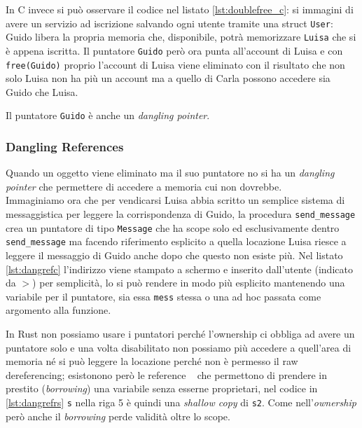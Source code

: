 \documentclass{article}
\begin{document}
In C invece si può osservare il codice nel listato \ref{lst:doublefree_c}: si immagini di avere un servizio ad iscrizione salvando ogni utente tramite una struct \texttt{User}: Guido libera la propria memoria che, disponibile, potrà memorizzare \texttt{Luisa} che si è appena iscritta. Il puntatore \texttt{Guido} però ora punta all'account di Luisa e con \texttt{free(Guido)} proprio l'account di Luisa viene eliminato con il risultato che non solo Luisa non ha più un account ma a quello di Carla possono accedere sia Guido che Luisa.




Il puntatore \texttt{Guido} è anche un \textit{dangling pointer}.

\subsubsection{Dangling References}
Quando un oggetto viene eliminato ma il suo puntatore no si ha un \textit{dangling pointer} che permettere di accedere a memoria cui non dovrebbe. \\
Immaginiamo ora che per vendicarsi Luisa abbia scritto un semplice sistema di messaggistica per leggere la corrispondenza di Guido, la procedura \texttt{send\_message} crea un puntatore di tipo \texttt{Message} che ha scope solo ed esclusivamente dentro \texttt{send\_message} ma facendo riferimento esplicito a quella locazione Luisa riesce a leggere il messaggio di Guido anche dopo che questo non esiste più. Nel listato \ref{lst:dangrefc} l'indirizzo viene stampato a schermo e inserito dall'utente (indicato da $>$) per semplicità, lo si può rendere in modo più esplicito mantenendo una variabile per il puntatore, sia essa \texttt{mess} stessa o una ad hoc passata come argomento alla funzione.




In Rust non possiamo usare i puntatori perché l'ownership ci obbliga ad avere un puntatore solo e una volta disabilitato non possiamo più accedere a quell'area di memoria né si può leggere la locazione perché non è permesso il raw dereferencing; esistonono però le reference ~\cite[4.2]{rust:language} che permettono di prendere in prestito (\textit{borrowing}) una variabile senza esserne proprietari, nel codice in \ref{lst:dangrefrs} \texttt{s} nella riga 5 è quindi una \textit{shallow copy} di \texttt{s2}. Come nell'\textit{ownership} però anche il \textit{borrowing} perde validità oltre lo scope.
\end{document}
